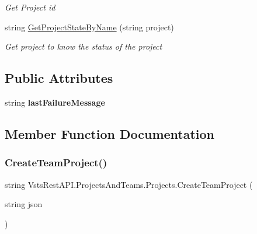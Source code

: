 \begin{DoxyCompactItemize}
\begin{DoxyCompactList}\small\item\em Get Project id \end{DoxyCompactList}\item 
string \mbox{\hyperlink{class_vsts_rest_a_p_i_1_1_projects_and_teams_1_1_projects_abd2b8fa4ffdb672a1975b61964f9d72f}{Get\+Project\+State\+By\+Name}} (string project)
\begin{DoxyCompactList}\small\item\em Get project to know the status of the project \end{DoxyCompactList}\end{DoxyCompactItemize}
\subsection*{Public Attributes}
\begin{DoxyCompactItemize}
\item 
\mbox{\label{class_vsts_rest_a_p_i_1_1_projects_and_teams_1_1_projects_a498b140ca253c7976fb8129793c2650e}} 
string {\bfseries last\+Failure\+Message}
\end{DoxyCompactItemize}


\subsection{Member Function Documentation}
\mbox{\label{class_vsts_rest_a_p_i_1_1_projects_and_teams_1_1_projects_a2dc9bc6f325831b4f86c91cdfbd2bcc9}} 
\subsubsection{\texorpdfstring{Create\+Team\+Project()}{CreateTeamProject()}}
{\footnotesize\ttfamily string Vsts\+Rest\+A\+P\+I.\+Projects\+And\+Teams.\+Projects.\+Create\+Team\+Project (\begin{DoxyParamCaption}\item[{string}]{json }\end{DoxyParamCaption})}



